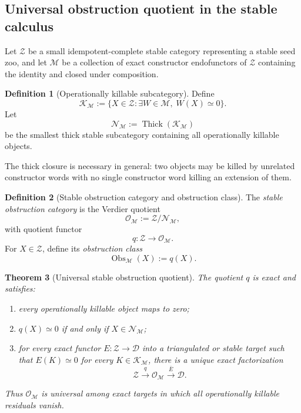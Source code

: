 \documentclass[11pt]{article}
\newtheorem{theorem}{Theorem}[section]
\theoremstyle{definition}
\newtheorem{definition}[theorem]{Definition}
\theoremstyle{remark}
\newcommand{\Obs}{\operatorname{Obs}}
\begin{document}
\subsection{Universal obstruction quotient in the stable calculus}

Let $\mathcal Z$ be a small idempotent-complete stable category representing a stable seed zoo, and let $\mathscr M$ be a collection of exact constructor endofunctors of $\mathcal Z$ containing the identity and closed under composition.

\begin{definition}[Operationally killable subcategory]
Define
\[
\mathcal K_{\mathscr M}
:=
\{X\in\mathcal Z:\exists W\in\mathscr M,\;W(X)\simeq0\}.
\]
Let
\[
\mathcal N_{\mathscr M}
:=
\operatorname{Thick}(\mathcal K_{\mathscr M})
\]
be the smallest thick stable subcategory containing all operationally killable objects.
\end{definition}

The thick closure is necessary in general: two objects may be killed by unrelated constructor words with no single constructor word killing an extension of them.

\begin{definition}[Stable obstruction category and obstruction class]\label{def:obstruction-quotient}
The \emph{stable obstruction category} is the Verdier quotient
\[
\mathcal O_{\mathscr M}
:=
\mathcal Z/\mathcal N_{\mathscr M},
\]
with quotient functor
\[
q:\mathcal Z\longrightarrow\mathcal O_{\mathscr M}.
\]
For $X\in\mathcal Z$, define its \emph{obstruction class}
\[
\Obs_{\mathscr M}(X):=q(X).
\]
\end{definition}

\begin{theorem}[Universal stable obstruction quotient]\label{thm:obstruction-quotient}
The quotient $q$ is exact and satisfies:
\begin{enumerate}
    \item every operationally killable object maps to zero;
    \item $q(X)\simeq0$ if and only if $X\in\mathcal N_{\mathscr M}$;
    \item for every exact functor $E:\mathcal Z\to\mathcal D$ into a triangulated or stable target such that $E(K)\simeq0$ for every $K\in\mathcal K_{\mathscr M}$, there is a unique exact factorization
    \[
    \mathcal Z\xrightarrow{q}\mathcal O_{\mathscr M}\xrightarrow{\bar E}\mathcal D.
    \]
\end{enumerate}
Thus $\mathcal O_{\mathscr M}$ is universal among exact targets in which all operationally killable residuals vanish.
\end{theorem}
\end{document}
